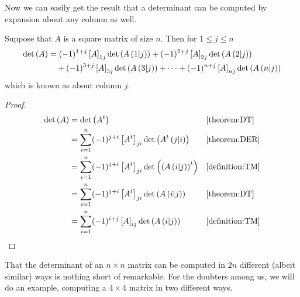 \documentclass{ximera}
\begin{document}
Now we can easily get the result that a determinant can be computed by
expansion about any column as well.

\begin{theorem}
  \label{theorem:DEC}
  Suppose that $A$ is a square matrix of size $n$.  Then for
  $1\leq j\leq n$
  \begin{align*}
  \det\left(A\right)&=
               (-1)^{1+j}\left\lbrack A\right\rbrack_{1j}\det\left(A\left(1|j\right)\right)+
               (-1)^{2+j}\left\lbrack A\right\rbrack_{2j}\det\left(A\left(2|j\right)\right)\\
             &\quad+(-1)^{3+j}\left\lbrack A\right\rbrack_{3j}\det\left(A\left(3|j\right)\right)+
               \cdots+
               (-1)^{n+j}\left\lbrack A\right\rbrack_{nj}\det\left(A\left(n|j\right)\right)
  \end{align*}
  which is known as  about column $j$.

  \begin{proof}

    \begin{align*}
      \det\left(A\right)
      &=
        \det\left(A^{t}\right)&&\ref{theorem:DT}\\
      &=
        \sum_{i=1}^{n}(-1)^{j+i}\left\lbrack A^{t}\right\rbrack_{ji}\det\left(A^{t}\left(j|i\right)\right)
                               &&\ref{theorem:DER}\\
      &=
        \sum_{i=1}^{n}(-1)^{j+i}\left\lbrack A^{t}\right\rbrack_{ji}\det\left(\left(A\left(i|j\right)\right)^{t}\right)
                               &&\ref{definition:TM}\\
      &=
        \sum_{i=1}^{n}(-1)^{j+i}\left\lbrack A^{t}\right\rbrack_{ji}\det\left(A\left(i|j\right)\right)
                               &&\ref{theorem:DT}\\
      &=
        \sum_{i=1}^{n}(-1)^{i+j}\left\lbrack A\right\rbrack_{ij}\det\left(A\left(i|j\right)\right)
                               &&\ref{definition:TM}
    \end{align*}
  \end{proof}
\end{theorem}

That the determinant of an $n\times n$ matrix can be computed in $2n$
different (albeit similar) ways is nothing short of remarkable.  For
the doubters among us, we will do an example, computing a $4\times 4$
matrix in two different ways.
\end{document}
